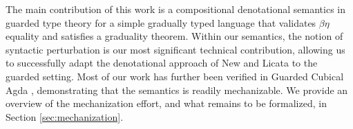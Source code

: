 The main contribution of this work is a compositional denotational semantics in
guarded type theory for a simple gradually typed language that validates
$\beta\eta$ equality and satisfies a graduality theorem.
%
%
Within our semantics, the notion of syntactic perturbation is our most
significant technical contribution, allowing us to successfully adapt the
denotational approach of New and Licata to the guarded setting.
%
Most of our work has further been verified in Guarded Cubical Agda
\cite{veltri-vezzosi2020}, demonstrating that the semantics is readily
mechanizable. We provide an overview of the mechanization effort, and what
remains to be formalized, in Section \ref{sec:mechanization}.
%


%


\begin{comment}
\begin{enumerate}
\item First, we give a simple concrete term semantics where we show
  how to model the dynamic type as a solution to a guarded domain equation.
\item Next, we identify where prior work on classical domain theoretic
  semantics of gradual typing breaks down when using guarded semantics
  of recursive types.
\item We develop a key new concept of \emph{syntactic perturbations},
  which allow us to recover enough extensional reasoning to model the
  graduality property compositionally.
\item We combine this insight together with an abstract categorical
  model of gradual typing using reflexive graph categories and
  call-by-push-value to give a compositional construction of our
  denotational model.
\item We prove that the resulting denotational model provides a
  well-behaved semantics as defined above by proving \emph{adequacy},
  respect for an equational theory and the graduality property.
\end{enumerate}
\end{comment}

